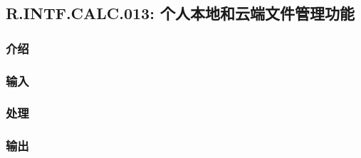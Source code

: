 \subsection{R.INTF.CALC.013: 个人本地和云端文件管理功能}
\subsubsection{介绍}
\subsubsection{输入}
\subsubsection{处理}
\subsubsection{输出}